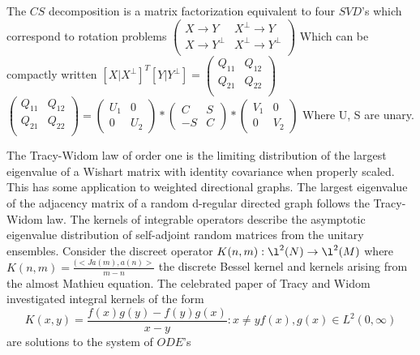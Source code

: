 The $CS$ decomposition is a matrix factorization equivalent to four $SVD$'s which correspond to rotation problems
$\left(\begin{array}{cc}
        X \rightarrow  Y & X^\perp \rightarrow  Y \\
        X \rightarrow  Y^\perp & X^\perp \rightarrow  Y^\perp \\
\end{array}\right)$
Which can be compactly written
$[X | X^\perp]^T [Y | Y^\perp ]=\left(
      \begin{array}{cc}
        Q_{11} & Q_{12} \\
        Q_{21} & Q_{22} \\
      \end{array}
\right)$
 $\left(
      \begin{array}{cc}
        Q_{11} & Q_{12} \\
        Q_{21} & Q_{22} \\
      \end{array}
\right)    = \left(
      \begin{array}{cc}
        U_1 & 0 \\
        0 & U_2
      \end{array}
\right) * \left(
      \begin{array}{cc}
        C & S \\
        -S & C
      \end{array}
\right) * \left(
      \begin{array}{cc}
        V_1 & 0 \\
        0 & V_2
      \end{array}
\right)
$
Where U, S are unary.

The Tracy-Widom law of order one is the limiting distribution of the largest eigenvalue of a Wishart matrix with identity covariance when properly scaled.  This has some application to weighted directional graphs.  The largest eigenvalue of the adjacency matrix of a random d-regular directed graph follows the Tracy-Widom law.  The kernels of integrable operators describe the asymptotic eigenvalue distribution of self-adjoint random matrices from the unitary ensembles. Consider the discreet operator $K(n,m):  \l^2(N) \rightarrow \l^2(M)$ where $K(n,m) = \frac{(<J a(m),a(n)>}{m-n}$ the discrete Bessel kernel and kernels arising from the almost Mathieu equation.  The celebrated paper of Tracy and Widom \cite{RMTTracy98correlationfunctions} investigated integral kernels of the form
\begin{equation*}
K(x,y)=\frac{f(x)g(y)-f(y)g(x)}{x-y} : x \neq y  f(x), g(x) \in L^2(0,\infty)
\end{equation*}
 are solutions to the system of $ODE$'s

